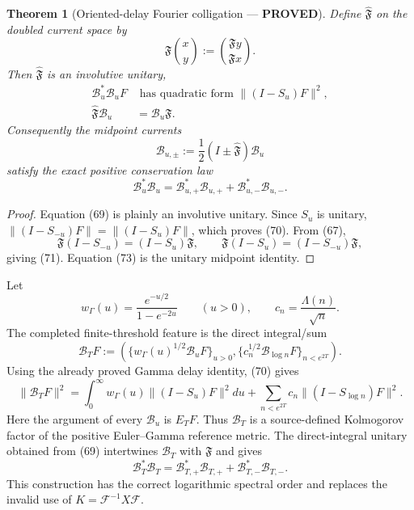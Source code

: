 \documentclass[11pt]{article}
\newtheorem{theorem}{Theorem}
\newcommand{\PROVED}{\textcolor{green!45!black}{\textbf{PROVED}}}
\begin{document}
\begin{theorem}[Oriented-delay Fourier colligation --- \PROVED]
Define $\widehat{\mathfrak F}$ on the doubled current space by
\begin{equation}
 \widehat{\mathfrak F}\binom{x}{y}
 :=\binom{\mathfrak Fy}{\mathfrak Fx}.                 \tag{69}
\end{equation}
Then $\widehat{\mathfrak F}$ is an involutive unitary,
\begin{align}
 \mathcal B_u^*\mathcal B_uF
 &\text{ has quadratic form }\|(I-S_u)F\|^2,           \tag{70}\\
 \widehat{\mathfrak F}\mathcal B_u
 &=\mathcal B_u\mathfrak F.                            \tag{71}
\end{align}
Consequently the midpoint currents
\begin{equation}
 \mathcal B_{u,\pm}:=\frac12
 (I\pm\widehat{\mathfrak F})\mathcal B_u              \tag{72}
\end{equation}
satisfy the exact positive conservation law
\begin{equation}
 \mathcal B_u^*\mathcal B_u
 =\mathcal B_{u,+}^*\mathcal B_{u,+}
 +\mathcal B_{u,-}^*\mathcal B_{u,-}.                  \tag{73}
\end{equation}
\end{theorem}

\begin{proof}
Equation (69) is plainly an involutive unitary.  Since $S_u$ is unitary,
$\|(I-S_{-u})F\|=\|(I-S_u)F\|$, which proves (70).
From (67),
\[
 \mathfrak F(I-S_{-u})=(I-S_u)\mathfrak F,
 \qquad
 \mathfrak F(I-S_u)=(I-S_{-u})\mathfrak F,
\]
giving (71).  Equation (73) is the unitary midpoint identity.
\end{proof}

Let
\[
 w_\Gamma(u)=\frac{e^{-u/2}}{1-e^{-2u}}\qquad(u>0),
 \qquad c_n=\frac{\Lambda(n)}{\sqrt n}.
\]
The completed finite-threshold feature is the direct integral/sum
\begin{equation}
 \mathcal B_TF:=
 \left(
   \{w_\Gamma(u)^{1/2}\mathcal B_uF\}_{u>0},
   \{c_n^{1/2}\mathcal B_{\log n}F\}_{n<e^{2T}}
 \right).                                               \tag{74}
\end{equation}
Using the already proved Gamma delay identity, (70) gives
\begin{equation}
 \|\mathcal B_TF\|^2
 =\int_0^\infty w_\Gamma(u)\|(I-S_u)F\|^2du
 +\sum_{n<e^{2T}}c_n\|(I-S_{\log n})F\|^2.             \tag{75}
\end{equation}
Here the argument of every $\mathcal B_u$ is $E_TF$.  Thus $\mathcal B_T$
is a source-defined Kolmogorov factor of the positive Euler--Gamma reference
metric.  The direct-integral unitary obtained from (69)
intertwines $\mathcal B_T$ with $\mathfrak F$ and gives
\begin{equation}
 \mathcal B_T^*\mathcal B_T
 =\mathcal B_{T,+}^*\mathcal B_{T,+}
 +\mathcal B_{T,-}^*\mathcal B_{T,-}.                  \tag{76}
\end{equation}
This construction has the correct logarithmic spectral order and replaces the
invalid use of $K=\mathcal F^{-1}X\mathcal F$.
\end{document}
